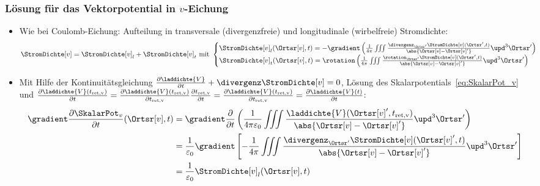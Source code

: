 \begin{frame}
  \frametitle{Lösung für das Vektorpotential in $v$-Eichung}
  \begin{itemize}[<+->]
  \item Wie bei Coulomb-Eichung: Aufteilung in transversale (divergenzfreie) und longitudinale (wirbelfreie) Stromdichte:
        \begin{equation*}
      \StromDichte[v] = \StromDichte[v]_l + \StromDichte[v]_t \text{ mit }
      \begin{cases}
        \StromDichte[v]_l (\Ortsr[v], t) = -\gradient \left( \frac{1}{4\pi} \iiint \frac{\divergenz_{\Ortsr^\prime}\StromDichte[v](\Ortsr^\prime, t)}{\abs{\Ortsr[v]-\Ortsr[v]^\prime}} \upd^3\Ortsr^\prime \right)\\
        \StromDichte[v]_t (\Ortsr[v], t) = \rotation \left( \frac{1}{4\pi} \iiint \frac{\rotation_{\Ortsr^\prime}\StromDichte[v](\Ortsr^\prime, t)}{\abs{\Ortsr[v]-\Ortsr[v]^\prime}} \upd^3\Ortsr^\prime \right) 
        
      \end{cases}
      \end{equation*}
    \item Mit Hilfe der Kontinuitätsgleichung $\frac{\partial \laddichte{V}}{\partial t} + \divergenz \StromDichte[v] = 0$, Lösung des Skalarpotentials~\eqref{eq:SkalarPot_v} und $\frac{\partial \laddichte{V}(t_{\text{ret,v}})}{\partial t}=\frac{\partial \laddichte{V}(t_{\text{ret,v}})}{\partial t_{\text{ret,v}}}\frac{\partial t_{\text{ret,v}}}{\partial t}=\frac{\partial \laddichte{V}(t_{\text{ret,v}})}{\partial t_{\text{ret,v}}}=\frac{\partial \laddichte{V}(t)}{\partial t}$:
      \begin{equation}
        \begin{aligned}
          \gradient \frac{\partial \SkalarPot_v}{\partial t}(\Ortsr[v], t) &= \gradient \frac{\partial}{\partial t} \left(\frac{1}{4\pi\varepsilon_0} \iiint \frac{\laddichte{V} (\Ortsr[v]^\prime, t_{\text{ret,v}})}{\abs{\Ortsr[v]-\Ortsr[v]^\prime}} \upd^3\Ortsr^\prime \right)\\
          &= \frac{1}{\varepsilon_0} \gradient \left[ -\frac{1}{4\pi}\iiint \frac{\divergenz_{\Ortsr^\prime} \StromDichte[v](\Ortsr[v]^\prime, t)}{\abs{\Ortsr[v]-\Ortsr[v]^\prime}} \upd^3\Ortsr^\prime\right]\\
          &=\frac{1}{\varepsilon_0} \StromDichte[v]_l(\Ortsr[v], t)
          \end{aligned}
        \end{equation}
  \end{itemize}
\end{frame}


